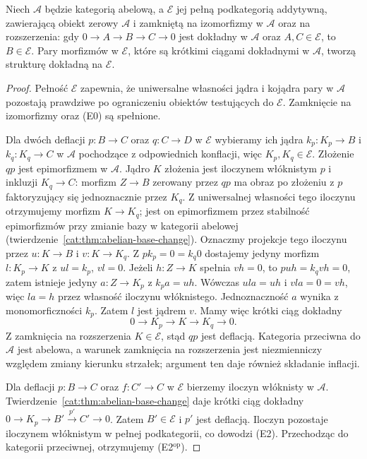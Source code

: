 \begin{twierdzenie}\label{cat:thm:quillen-extension-closed}
Niech $\mathcal A$ będzie kategorią abelową, a $\mathcal E$ jej pełną podkategorią addytywną, zawierającą obiekt zerowy $\mathcal A$ i zamkniętą na izomorfizmy w $\mathcal A$ oraz na rozszerzenia: gdy $0\to A\to B\to C\to0$ jest dokładny w $\mathcal A$ oraz $A,C\in\mathcal E$, to $B\in\mathcal E$. Pary morfizmów w $\mathcal E$, które są krótkimi ciągami dokładnymi w $\mathcal A$, tworzą strukturę dokładną na $\mathcal E$.
\end{twierdzenie}
\begin{proof}
Pełność $\mathcal E$ zapewnia, że uniwersalne własności jądra i kojądra pary w $\mathcal A$ pozostają prawdziwe po ograniczeniu obiektów testujących do $\mathcal E$. Zamknięcie na izomorfizmy oraz (E0) są spełnione.

Dla dwóch deflacji $p:B\to C$ oraz $q:C\to D$ w $\mathcal E$ wybieramy ich jądra $k_p:K_p\to B$ i $k_q:K_q\to C$ w $\mathcal A$ pochodzące z odpowiednich konflacji, więc $K_p,K_q\in\mathcal E$. Złożenie $qp$ jest epimorfizmem w $\mathcal A$. Jądro $K$ złożenia jest iloczynem włóknistym $p$ i inkluzji $K_q\to C$: morfizm $Z\to B$ zerowany przez $qp$ ma obraz po złożeniu z $p$ faktoryzujący się jednoznacznie przez $K_q$. Z uniwersalnej własności tego iloczynu otrzymujemy morfizm $K\to K_q$; jest on epimorfizmem przez stabilność epimorfizmów przy zmianie bazy w kategorii abelowej (twierdzenie~\ref{cat:thm:abelian-base-change}). Oznaczmy projekcje tego iloczynu przez $u:K\to B$ i $v:K\to K_q$. Z $pk_p=0=k_q0$ dostajemy jedyny morfizm $l:K_p\to K$ z $ul=k_p$, $vl=0$. Jeżeli $h:Z\to K$ spełnia $vh=0$, to $puh=k_qvh=0$, zatem istnieje jedyny $a:Z\to K_p$ z $k_pa=uh$. Wówczas $ula=uh$ i $vla=0=vh$, więc $la=h$ przez własność iloczynu włóknistego. Jednoznaczność $a$ wynika z monomorficzności $k_p$. Zatem $l$ jest jądrem $v$. Mamy więc krótki ciąg dokładny
\[
 0\longrightarrow K_p\longrightarrow K\longrightarrow K_q\longrightarrow0.
\]
Z zamknięcia na rozszerzenia $K\in\mathcal E$, stąd $qp$ jest deflacją. Kategoria przeciwna do $\mathcal A$ jest abelowa, a warunek zamknięcia na rozszerzenia jest niezmienniczy względem zmiany kierunku strzałek; argument ten daje również składanie inflacji.

Dla deflacji $p:B\to C$ oraz $f:C'\to C$ w $\mathcal E$ bierzemy iloczyn włóknisty w $\mathcal A$. Twierdzenie~\ref{cat:thm:abelian-base-change} daje krótki ciąg dokładny $0\to K_p\to B'\xrightarrow{p'}C'\to0$. Zatem $B'\in\mathcal E$ i $p'$ jest deflacją. Iloczyn pozostaje iloczynem włóknistym w pełnej podkategorii, co dowodzi (E2). Przechodząc do kategorii przeciwnej, otrzymujemy (E2$^{\mathrm{op}}$).
\end{proof}

